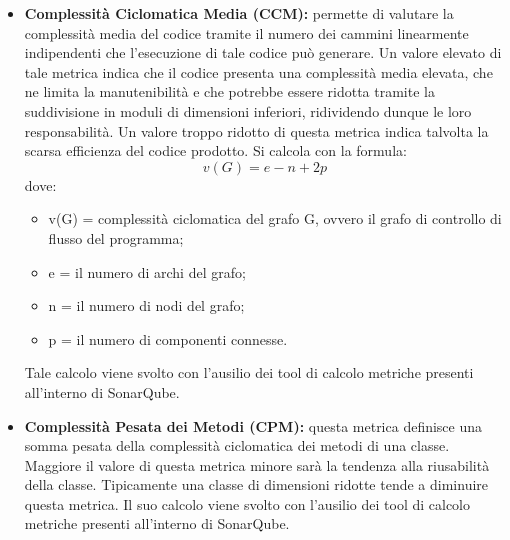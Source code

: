 \begin{itemize}
	\label{metrics:CCM}
	\item \textbf{Complessità Ciclomatica Media (CCM): }permette di valutare la complessità media del codice tramite il numero dei cammini linearmente indipendenti che l'esecuzione di tale codice può generare. Un valore elevato di tale metrica indica che il codice presenta una complessità media elevata, che ne limita la manutenibilità e che potrebbe essere ridotta tramite la suddivisione in moduli di dimensioni inferiori, ridividendo dunque le loro responsabilità. Un valore troppo ridotto di questa metrica indica talvolta la scarsa efficienza del codice prodotto. Si calcola con la formula:    
	$$	v(G)=e-n+2p $$
	dove:
	\begin{itemize}	
	\item v(G) = complessità ciclomatica del grafo G, ovvero il grafo di controllo di flusso del programma;
	\item e = il numero di archi del grafo;
	\item n = il numero di nodi del grafo;
	\item p = il numero di componenti connesse.
	\end{itemize}	
	Tale calcolo viene svolto con l'ausilio dei tool di calcolo metriche presenti all'interno di SonarQube.
	\label{metrics:CPM}
	\item \textbf{Complessità Pesata dei Metodi (CPM): }questa metrica definisce una somma pesata della complessità ciclomatica dei metodi di una classe. Maggiore il valore di questa metrica minore sarà la tendenza alla riusabilità della classe. Tipicamente una classe di dimensioni ridotte tende a diminuire questa metrica. Il suo calcolo viene svolto con l'ausilio dei tool di calcolo metriche presenti all'interno di SonarQube.

\end{itemize}
